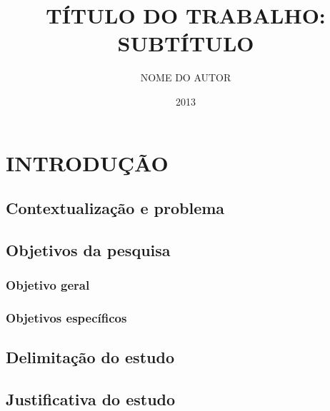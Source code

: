 \documentclass{tccbsi}
\title{TÍTULO DO TRABALHO: SUBTÍTULO}
\author{NOME DO AUTOR}
\date{2013}
\begin{document}
\section{INTRODUÇÃO}

\lipsum[1-3]

\subsection{Contextualização e problema}

\lipsum[1-3]

\subsection{Objetivos da pesquisa}

\lipsum[1-3]

    \subsubsection{Objetivo geral}

    \lipsum[1-3]

    \subsubsection{Objetivos específicos}

    \lipsum[1-3]

\subsection{Delimitação do estudo}

\lipsum[1-3]

\subsection{Justificativa do estudo}

\lipsum[1-3]
\end{document}
